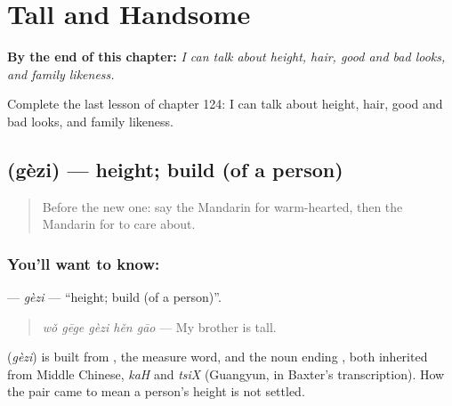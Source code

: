 
\chapter{Tall and Handsome}
\label{ch:zh-tall-and-handsome}

\begin{chapteropening}
\textbf{By the end of this chapter:} \emph{I can talk about height, hair, good and bad looks, and family likeness.}

Complete the last lesson of chapter 124: I can talk about height, hair, good and bad looks, and family likeness.
\end{chapteropening}

\section[\texorpdfstring{\zh{个子} (gèzi)}{个子 (gèzi)}]{ (gèzi) — height; build (of a person)}

\label{lesson:ZH-C124-gezi}



\begin{quote}
Before the new one: say the Mandarin for warm-hearted, then the Mandarin for to care about.
\end{quote}

\subsection*{You'll want to know: }
\textbf{} — \emph{gèzi} — \textquotedblleft{}height; build (of a person)\textquotedblright{}.

\begin{quote}
\emph{wǒ gēge gèzi hěn gāo} — My brother is tall.
\end{quote}

\begin{cousinweb}
\textbf{} (\emph{gèzi}) is built from , the measure word, and the noun ending , both inherited from Middle Chinese, \emph{kaH} and \emph{tsiX} (Guangyun, in Baxter's transcription). How the pair came to mean a person's height is not settled.
\end{cousinweb}

